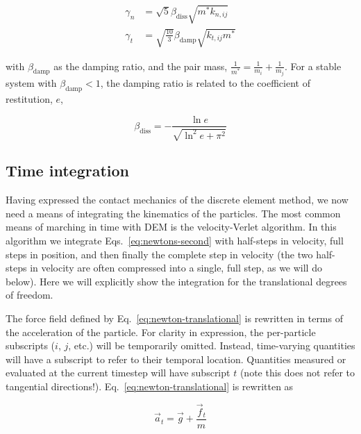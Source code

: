 \begin{subequations}
\begin{align}
	\gamma_n &= \sqrt{5}\beta_\text{diss}\sqrt{m^*k_{n,ij}} \\
	\gamma_t &= \sqrt{\frac{10}{3}}\beta_\text{damp}\sqrt{k_{t,ij} m^*}
\end{align}
\end{subequations}

with $\beta_\text{damp}$ as the damping ratio, and the pair mass, $\frac{1}{m^*} = \frac{1}{m_i} + \frac{1}{m_j}$. For a stable system with $\beta_\text{damp} < 1$, the damping ratio is related to the coefficient of restitution, $e$,

\begin{equation}
	\beta_\text{diss} = -\frac{\ln{e}}{\sqrt{\ln^2{e}+\pi^2}}
\end{equation}





\subsection{Time integration}\label{sec:velocity-verlet}

Having expressed the contact mechanics of the discrete element method, we now need a means of integrating the kinematics of the particles. The most common means of marching in time with DEM is the velocity-Verlet algorithm\cite{Kruggel-Emden2008}. In this algorithm we integrate Eqs.~\ref{eq:newtons-second} with half-steps in velocity, full steps in position, and then finally the complete step in velocity (the two half-steps in velocity are often compressed into a single, full step, as we will do below). Here we will explicitly show the integration for the translational degrees of freedom. 

The force field defined by Eq.~\ref{eq:newton-translational} is rewritten in terms of the acceleration of the particle. For clarity in expression, the per-particle subscripts ($i$, $j$, etc.) will be temporarily omitted. Instead, time-varying quantities will have a subscript to refer to their temporal location. Quantities measured or evaluated at the current timestep will have subscript $t$ (note this does not refer to tangential directions!). Eq.~\ref{eq:newton-translational} is rewritten as

\begin{equation}\label{eq:newton-acceleration}
	\vec{a}_t = \vec{g} + \frac{\vec{f}_t}{m}
\end{equation}

